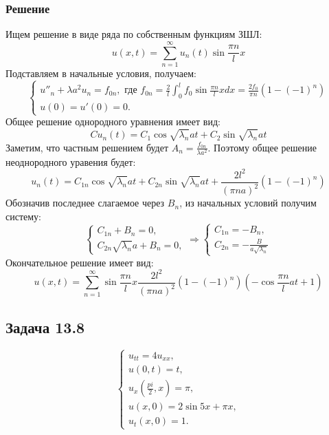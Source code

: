 \documentclass[11pt]{article}
\begin{document}
\subsubsection{Решение}
\label{sec:org8544d6a}
Ищем решение в виде ряда по собственным функциям ЗШЛ:
\begin{equation}
u(x, t) = \sum_{n = 1}^{\infty}u_n(t)\sin\frac{\pi n}lx
\end{equation}
Подставляем в начальные условия, получаем:
\begin{equation}
\begin{cases}
u''_n + \lambda a^2u_n = f_{0n}, \text{ где } f_{0n} = \frac2l\int_0^lf_0\sin\frac{\pi n}lxdx = \frac{2f_0}{\pi n}(1 - (-1)^n) \\
u(0) = u'(0) = 0.
\end{cases}
\end{equation}
Общее решение однородного уравнения имеет вид:
\begin{equation}
Cu_n(t) = C_1\cos\sqrt{\lambda_n}at + C_2\sin\sqrt{\lambda_n}at
\end{equation}
Заметим, что частным решением будет $A_n = \frac{f_{0n}}{\lambda a^2}$. Поэтому общее решение
неоднородного уравения будет:
\begin{equation}
u_n(t) = C_{1n}\cos\sqrt{\lambda_n}at + C_{2n}\sin\sqrt{\lambda_n}at + \frac{2l^2}{(\pi na)^2}(1 - (-1)^n)
\end{equation}
Обозначив последнее слагаемое через $B_n$, из начальных условий получим систему:
\begin{equation}
\begin{cases}
C_{1n} + B_n = 0, \\
C_{2n}\sqrt{\lambda_n}a + B_n = 0,
\end{cases}
\Rightarrow
\begin{cases}
C_{1n} = -B_n, \\
C_{2n} = -\frac{B}{a\sqrt{\lambda_n}}
\end{cases}
\end{equation}
Окончательное решение имеет вид:
\begin{equation}
u(x, t) = \sum_{n = 1}^{\infty}\sin\frac{\pi n}lx\frac{2l^2}{(\pi n a)^2}(1 - (-1)^n)\left(-\cos\frac{\pi n}lat + 1\right)
\end{equation}
\subsection{Задача 13.8}
\label{sec:org1eb5e05}
\begin{equation}
\begin{cases}
u_{tt} = 4u_{xx}, \\
u(0, t) = t, \\
u_x\left(\frac{pi}2, x\right) = \pi, \\
u(x, 0) = 2\sin5x + \pi x, \\
u_t(x, 0) = 1.
\end{cases}
\end{equation}
\end{document}

